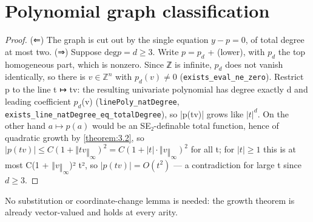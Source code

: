 \section{Polynomial graph classification}\label{sec:5}
\begin{proof}
(⇐) The graph is cut out by the single equation $y − p = 0$, of total degree at most two. (⇒) Suppose $\mathrm{deg} p = d ≥ 3$. Write $p = p_{d}$ + (lower), with $p_{d}$ the top homogeneous part, which is nonzero. Since ℤ is infinite, $p_{d}$ does not vanish identically, so there is $v ∈ ℤ^{n}$ with $p_{d}(v) ≠ 0$ (\texttt{exists\_\allowbreak{}eval\_\allowbreak{}ne\_\allowbreak{}zero}). Restrict p to the line t ↦ tv: the resulting univariate polynomial has degree exactly d and leading coefficient $p_{d}$(v) (\texttt{linePoly\_\allowbreak{}natDegree}, \texttt{exists\_\allowbreak{}line\_\allowbreak{}natDegree\_\allowbreak{}eq\_\allowbreak{}totalDegree}), so |p(tv)| grows like $|t|^{d}$. On the other hand $a ↦ p(a)$ would be an SE₂-definable total function, hence of quadratic growth by \cref{theorem:3.2}, so $|p(tv)| ≤ C(1 + ‖tv‖_{∞})^{2} = C(1 + |t|·‖v‖_{∞})^{2}$ for all t; for $|t| ≥ 1$ this is at most C(1 + $‖v‖_{∞}$)² t², so $|p(tv)| = O(t^{2})$ — a contradiction for large t since $d ≥ 3$.

\end{proof}
No substitution or coordinate-change lemma is needed: the growth theorem is already vector-valued and holds at every arity.

